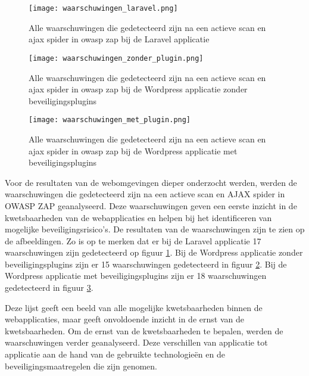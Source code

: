 \begin{figure}
    \centering
    \texttt{[image: waarschuwingen\_laravel.png]}
    \caption[Alle waarschuwingen die gedetecteerd zijn na een actieve scan en ajax spider in owasp zap bij de Laravel applicatie]
    {Alle waarschuwingen die gedetecteerd zijn na een actieve scan en ajax spider in owasp zap bij de Laravel applicatie}
    \label{fig:waarschuwingen_laravel}
\end{figure}
\begin{figure}
    \centering
    \texttt{[image: waarschuwingen\_zonder\_plugin.png]}
    \caption[Alle waarschuwingen die gedetecteerd zijn na een actieve scan en ajax spider in owasp zap bij de Wordpress applicatie zonder beveiligingsplugins]
    {Alle waarschuwingen die gedetecteerd zijn na een actieve scan en ajax spider in owasp zap bij de Wordpress applicatie zonder beveiligingsplugins}
    \label{fig:waarschuwingen_zonder}
\end{figure}
\begin{figure}
    \centering
    \texttt{[image: waarschuwingen\_met\_plugin.png]}
    \caption[Alle waarschuwingen die gedetecteerd zijn na een actieve scan en ajax spider in owasp zap bij de Wordpress applicatie met beveiligingsplugins]
    {Alle waarschuwingen die gedetecteerd zijn na een actieve scan en ajax spider in owasp zap bij de Wordpress applicatie met beveiligingsplugins}
    \label{fig:waarschuwingen_met}
\end{figure}

Voor de resultaten van de webomgevingen dieper onderzocht werden, werden de waarschuwingen die gedetecteerd zijn na een actieve scan en AJAX spider in OWASP ZAP 
geanalyseerd. Deze waarschuwingen geven een eerste inzicht in de kwetsbaarheden van de webapplicaties en helpen bij het identificeren van 
mogelijke beveiligingsrisico's. De resultaten van de waarschuwingen zijn te zien op de afbeeldingen. Zo is op te merken dat er bij de 
Laravel applicatie 17 waarschuwingen zijn gedetecteerd op figuur \ref{fig:waarschuwingen_laravel}. Bij de Wordpress applicatie zonder 
beveiligingsplugins zijn er 15 waarschuwingen gedetecteerd in figuur \ref{fig:waarschuwingen_zonder}. Bij de Wordpress 
applicatie met beveiligingsplugins zijn er 18 waarschuwingen gedetecteerd in figuur \ref{fig:waarschuwingen_met}.

Deze lijst geeft een beeld van alle mogelijke kwetsbaarheden binnen de webapplicaties, maar geeft onvoldoende inzicht in de 
ernst van de kwetsbaarheden. Om de ernst van de kwetsbaarheden te bepalen, werden de waarschuwingen verder geanalyseerd. 
Deze verschillen van applicatie tot applicatie aan de hand van de gebruikte technologieën en de 
beveiligingsmaatregelen die zijn genomen.

